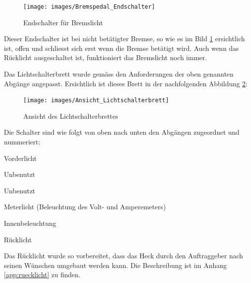 \begin{itemize}
\begin{figure}[h!]
	\centering
		\texttt{[image: images/Bremspedal\_Endschalter]}
	\caption{Endschalter für Bremslicht}
	\label{fig:EndschalterBremslicht}
\end{figure}

Dieser Endschalter ist bei nicht betätigter Bremse, so wie es im Bild \ref{fig:EndschalterBremslicht} ersichtlich ist, offen und schliesst sich erst wenn die Bremse betätigt wird. Auch wenn das Rücklicht ausgeschaltet ist, funktioniert das Bremslicht noch immer.

\end{itemize}

\newpage

Das Lichtschalterbrett wurde  gemäss den Anforderungen der oben genannten Abgänge angepasst. Ersichtlich ist dieses Brett in der nachfolgenden Abbildung \ref{fig:AnsichtLichtschalterbrett}:

\begin{figure}[h!]
	\centering
		\texttt{[image: images/Ansicht\_Lichtschalterbrett]}
	\caption{Ansicht des Lichtschalterbrettes}
	\label{fig:AnsichtLichtschalterbrett}
\end{figure}

Die Schalter sind wie folgt von oben nach unten den Abgängen zugeordnet und nummeriert:

\begin{compactenum}
\item Vorderlicht
\item Unbenutzt
\item Unbenutzt
\item Meterlicht (Beleuchtung des Volt- und Amperemeters)
\item Innenbeleuchtung
\item Rücklicht
\end{compactenum}

Das Rücklicht wurde so vorbereitet, dass das Heck durch den Auftraggeber nach seinen Wünschen umgebaut werden kann. Die Beschreibung ist im Anhang \ref{app:ruecklicht} zu finden.

\color{black}
\newpage